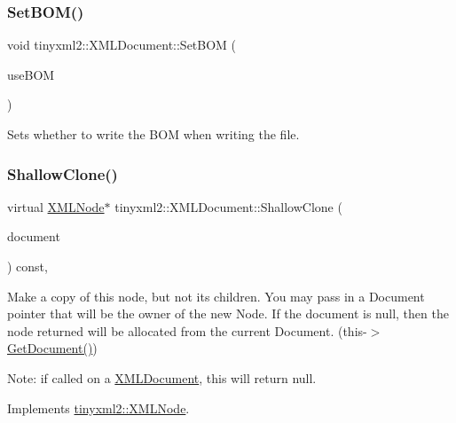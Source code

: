 \subsubsection{\texorpdfstring{Set\+B\+O\+M()}{SetBOM()}}
{\footnotesize\ttfamily void tinyxml2\+::\+X\+M\+L\+Document\+::\+Set\+B\+OM (\begin{DoxyParamCaption}\item[{bool}]{use\+B\+OM }\end{DoxyParamCaption})\hspace{0.3cm}{\ttfamily [inline]}}

Sets whether to write the B\+OM when writing the file. \mbox{\label{classtinyxml2_1_1_x_m_l_document_aa37cc1709d7e1e988bc17dcfb24a69b8}} 
\subsubsection{\texorpdfstring{Shallow\+Clone()}{ShallowClone()}}
{\footnotesize\ttfamily virtual \mbox{\hyperlink{classtinyxml2_1_1_x_m_l_node}{X\+M\+L\+Node}}$\ast$ tinyxml2\+::\+X\+M\+L\+Document\+::\+Shallow\+Clone (\begin{DoxyParamCaption}\item[{\mbox{\hyperlink{classtinyxml2_1_1_x_m_l_document}{X\+M\+L\+Document}} $\ast$}]{document }\end{DoxyParamCaption}) const\hspace{0.3cm}{\ttfamily [inline]}, {\ttfamily [virtual]}}

Make a copy of this node, but not its children. You may pass in a Document pointer that will be the owner of the new Node. If the \textquotesingle{}document\textquotesingle{} is null, then the node returned will be allocated from the current Document. (this-\/$>$\mbox{\hyperlink{classtinyxml2_1_1_x_m_l_node_af343d1ef0b45c0020e62d784d7e67a68}{Get\+Document()}})

Note\+: if called on a \mbox{\hyperlink{classtinyxml2_1_1_x_m_l_document}{X\+M\+L\+Document}}, this will return null. 

Implements \mbox{\hyperlink{classtinyxml2_1_1_x_m_l_node_a8402cbd3129d20e9e6024bbcc0531283}{tinyxml2\+::\+X\+M\+L\+Node}}.

\mbox{\label{classtinyxml2_1_1_x_m_l_document_a6fe5ef18699091844fcf64b56ffa5bf9}} 

